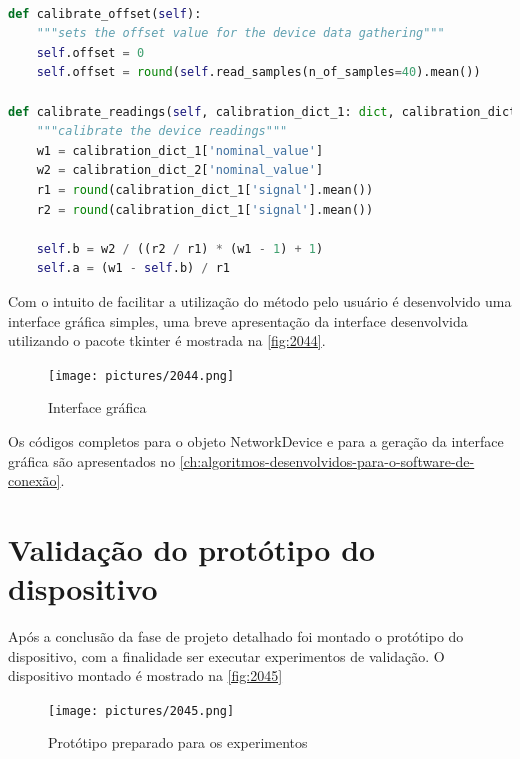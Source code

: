 \begin{lstlisting}[label={lst:objectcalibration},language=Python,caption={[Network Device calibrate offset]{Métodos de calibração do objeto NetworkDevice}}]

def calibrate_offset(self):
	"""sets the offset value for the device data gathering"""
	self.offset = 0
	self.offset = round(self.read_samples(n_of_samples=40).mean())

def calibrate_readings(self, calibration_dict_1: dict, calibration_dict_2: dict):
	"""calibrate the device readings"""
	w1 = calibration_dict_1['nominal_value']
	w2 = calibration_dict_2['nominal_value']
	r1 = round(calibration_dict_1['signal'].mean())
	r2 = round(calibration_dict_1['signal'].mean())

	self.b = w2 / ((r2 / r1) * (w1 - 1) + 1)
	self.a = (w1 - self.b) / r1

\end{lstlisting}

Com o intuito de facilitar a utilização do método pelo usuário é desenvolvido uma interface gráfica simples, uma breve apresentação da interface desenvolvida utilizando o pacote tkinter é mostrada na \autoref{fig:2044}.

\begin{figure}[H]
	\caption{\label{fig:2044} Interface gráfica}
		\begin{center}
			\texttt{[image: pictures/2044.png]}
		\end{center}
\end{figure}

Os códigos completos para o objeto NetworkDevice e para a geração da interface gráfica são apresentados no \autoref{ch:algoritmos-desenvolvidos-para-o-software-de-conexão}.

\section{Validação do protótipo do dispositivo}

Após a conclusão da fase de projeto detalhado foi montado o protótipo do dispositivo, com a finalidade ser executar experimentos de validação. O dispositivo montado é mostrado na \autoref{fig:2045}

\begin{figure}[H]
	\caption{\label{fig:2045} Protótipo preparado para os experimentos}
		\begin{center}
			\texttt{[image: pictures/2045.png]}
		\end{center}
\end{figure}

